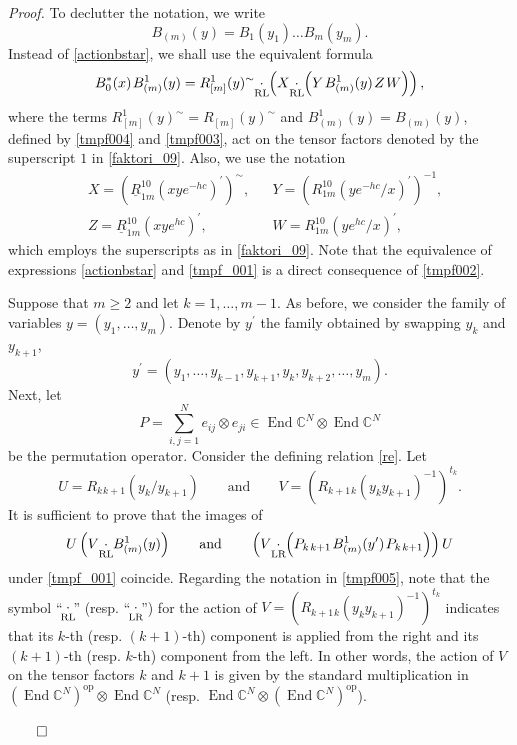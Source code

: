 \documentclass[12pt,a4paper,reqno]{amsart}
\theoremstyle{stil}
\theoremstyle{defi}
\theoremstyle{defi}
\theoremstyle{stil}
\theoremstyle{stil}
\theoremstyle{stil}
\theoremstyle{prim}
\newenvironment{prf}{\noindent \textit{Proof.}}{\null\hfill$\qed$\hskip
2mm\vskip 2mm}
\newcommand{\wndr}{\underline}
\newcommand{\Fand}{\qquad\text{and}\qquad}
\newcommand{\beq}{\begin{equation}}
\newcommand{\eeq}{\end{equation}}
\newcommand{\ot}{\otimes}
\newcommand{\ts}{\hspace{1pt}}
\newcommand{\ndo}{\mathop{\mathrm{End}}}
\newcommand{\RRR}{\wndr{R}}
\newcommand{\CC}{\mathbb{C}}
\newcommand{\cdotrl}{\mathop{\hspace{-2pt}\underset{\text{RL}}{\cdot}\hspace{-2pt}}}
\newcommand{\cdotlr}{\mathop{\hspace{-2pt}\underset{\text{LR}}{\cdot}\hspace{-2pt}}}
\begin{document}
\begin{prf}
To declutter the notation, we  write
\beq\label{tmpf003}
B_{(m)} (y) = B_1(y_1)\ldots B_m(y_m) .
\eeq
Instead of \eqref{actionbstar}, we shall use the equivalent formula 
\beq\label{tmpf_001}
  B_0^{* }(x)\ts   B_{(m)}^1(y) =
	R_{[m]}^1 (y)^\sim \cdotrl\left(
 X \cdotrl\left(
 Y \ts B_{(m)}^1(y)\ts Z  \ts W \right)\right),
\eeq
where the terms $R_{[m]}^1 (y)^\sim= R_{[m]} (y)^\sim$  and $B_{(m)}^1(y)=B_{(m)} (y)$, defined by \eqref{tmpf004} and \eqref{tmpf003}, act  on the tensor factors denoted by the superscript $1$ in \eqref{faktori_09}. Also, we use the notation
\begin{align}
&X=\left(\RRR_{1m}^{10}(xye^{-hc })^\prime\right)^\sim, &&Y=\left(R_{1m}^{10}(ye^{- hc }/x)^\prime\right)^{-1},\label{xandy}\\
&Z=\RRR_{1m}^{10}(xye^{ hc })^\prime ,&& W=R_{1m}^{10}(ye^{ hc }/x)^\prime ,\label{zandw}
\end{align}
which employs the superscripts as in \eqref{faktori_09}.
Note that the equivalence of expressions \eqref{actionbstar} and \eqref{tmpf_001} is a direct consequence of
\eqref{tmpf002}.

Suppose that $m\geqslant 2$ and let $k=1,\ldots ,m-1$. As before, we consider the family of variables $y=(y_1,\ldots ,y_m)$. Denote by $y^\prime$ the family obtained by swapping $y_k$ and $y_{k+1}$,  
$$
 y^\prime=(y_1,\ldots ,y_{k-1},y_{k+1},y_k,y_{k+2},\ldots ,y_m) .
$$
Next, let 
\beq\label{permutationoperator}
P=\sum_{i,j=1}^N e_{ij}\ot e_{ji}\in\ndo\CC^N \ot\ndo\CC^N
\eeq
be the permutation operator.
Consider the defining relation \eqref{re}. Let
\beq\label{tmpf20}
U=R_{k\ts k+1}(y_k/y_{k+1})\Fand
V=\left(R_{k+1\ts k}(y_k y_{k+1})^{-1}\right)^{t_k}.
\eeq
It is sufficient to prove that the images of
\beq\label{tmpf005}
U
\left(
V\cdotrl
B_{(m)}^1(y)
\right)
\Fand 
\left(V
\cdotlr
\left(P_{k\ts k+1}\ts
B_{(m)}^1(y^\prime)\ts
P_{k\ts k+1}\right) 
\right)
U
\eeq
under \eqref{tmpf_001} coincide. Regarding the notation in \eqref{tmpf005}, note that the symbol ``$\cdotrl$'' (resp. ``$\cdotlr$'')
for the action of $V=\left(R_{k+1\ts k}(y_k y_{k+1})^{-1}\right)^{t_k}$ indicates that its $k$-th (resp. $(k+1)$-th) component  is applied from the right and its $(k+1)$-th (resp. $ k $-th) component from the left. In other words, the action of $V$ on the tensor factors $k$ and $k+1$ is given by the standard multiplication in $(\ndo\CC^N)^{\text{op}}\ot\ndo\CC^N$
(resp. $\ndo\CC^N \ot (\ndo\CC^N)^{\text{op}} $).


\end{prf}
\end{document}

